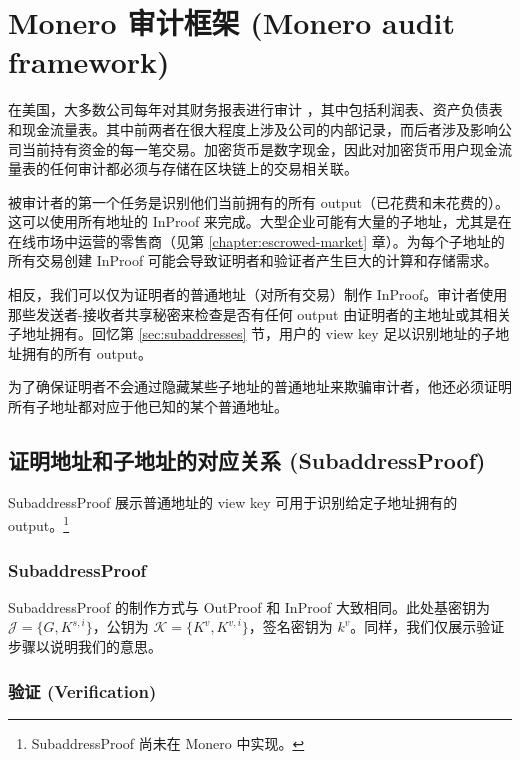 \section{Monero 审计框架 (Monero audit framework)}
\label{sec:proofs-monero-audit-framework}

在美国，大多数公司每年对其财务报表进行审计 \cite{investopedia-audits}，其中包括利润表、资产负债表和现金流量表。其中前两者在很大程度上涉及公司的内部记录，而后者涉及影响公司当前持有资金的每一笔交易。加密货币是数字现金，因此对加密货币用户现金流量表的任何审计都必须与存储在区块链上的交易相关联。

被审计者的第一个任务是识别他们当前拥有的所有 output（已花费和未花费的）。这可以使用所有地址的 InProof 来完成。大型企业可能有大量的子地址，尤其是在在线市场中运营的零售商（见第 \ref{chapter:escrowed-market} 章）。为每个子地址的所有交易创建 InProof 可能会导致证明者和验证者产生巨大的计算和存储需求。

相反，我们可以仅为证明者的普通地址（对所有交易）制作 InProof。审计者使用那些发送者-接收者共享秘密来检查是否有任何 output 由证明者的主地址或其相关子地址拥有。回忆第 \ref{sec:subaddresses} 节，用户的 view key 足以识别地址的子地址拥有的所有 output。

为了确保证明者不会通过隐藏某些子地址的普通地址来欺骗审计者，他还必须证明所有子地址都对应于他已知的某个普通地址。


\subsection{证明地址和子地址的对应关系 (SubaddressProof)}
\label{subsec:proofs-address-subaddress-correspond-subaddressproof}

SubaddressProof 展示普通地址的 view key 可用于识别给定子地址拥有的 output。\footnote{SubaddressProof 尚未在 Monero 中实现。}

\subsubsection*{SubaddressProof}
SubaddressProof 的制作方式与 OutProof 和 InProof 大致相同。此处基密钥为 $\mathcal{J} = \{G, K^{s,i}\}$，公钥为 $\mathcal{K} = \{K^v, K^{v,i}\}$，签名密钥为 $k^v$。同样，我们仅展示验证步骤以说明我们的意思。

\subsubsection*{验证 (Verification)}

